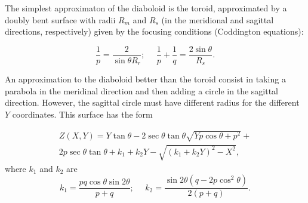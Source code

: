 \documentclass{iucr}              %
\newcommand{\inred}[1]{{\color{red}#1}}
\begin{document}
The simplest approximaton of the diaboloid is the toroid, approximated by a doubly bent surface with radii $R_m$ and $R_s$ (in the meridional and sagittal directions, respectively) given by the focusing conditions (Coddington equations):

\begin{equation}
\label{eqn:radii}
\frac{1}{p} = \frac{2 }{\sin\theta R_r};~~~~~~
\frac{1}{p} + \frac{1}{q} = \frac{2\sin\theta}{ R_s}.
\end{equation}

% 

An approximation to the diaboloid better than the toroid consist in taking a parabola in the meridinal direction and then adding a circle in the sagittal direction. However, the sagittal circle must have different radius for the different $Y$ coordinates. This surface has the form \cite{part2}

% 
\begin{multline}
\label{eqn:parabolicCone}
Z(X,Y) = Y \tan\theta - 2 \sec\theta \tan\theta
\sqrt{Y p \cos\theta + p^2} + \\
2 p \sec\theta \tan\theta +
k_1 + k_2 Y - \sqrt{(k_1 + k_2 Y)^2 - X^2},
\end{multline}
where $k_1$ and $k_2$ are
\begin{equation}
k_1 = \frac{p q \cos\theta \sin2\theta}{p+q};~~~~~~
k_2 = \frac{\sin2\theta(q-2p\cos^2\theta)}{2(p+q)}.
\end{equation}
% 
\end{document}
